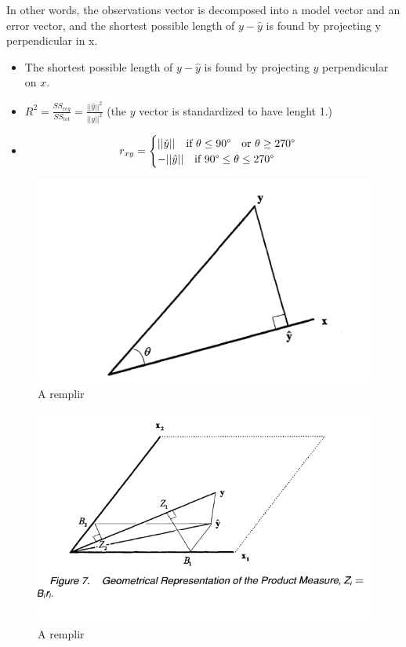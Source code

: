 \documentclass[
]{report}
\providecommand{\tightlist}{%
  \setlength{\itemsep}{0pt}\setlength{\parskip}{0pt}}
\begin{document}
In other words, the observations vector is decomposed into a model vector and an error vector, and the shortest possible length of \(y-\hat{y}\) is found by projecting y perpendicular in x.

\begin{itemize}
\tightlist
\item
  The shortest possible length of \(y - \hat{y}\) is found by projecting \(y\) perpendicular on \(x\).
\item
  \(R^2 = \frac{SS_{reg}}{SS_{tot}}= \frac{||\hat{y}||^2}{||y||^2}\) (the \(y\) vector is standardized to have lenght 1.)
\item
  \[r_{xy} = 
  \begin{cases} ||\hat{y}||  \ \ \ \text{if}  \  \theta \leq 90 \degree \ \ \ \text{or} \ \theta \geq 270 \degree  \\ -||\hat{y}|| \ \ \ \text{if}  \ 90\degree \leq \theta \leq 270\degree
  \end{cases}\]
\end{itemize}

\begin{figure}
    \centering
    \includegraphics[width= 250 pt]{bring1.PNG}
    \caption{A remplir}
\end{figure}

\begin{figure}
    \centering
    \includegraphics[width= 250 pt]{bring.PNG}
    \caption{A remplir}
\end{figure}
\end{document}
